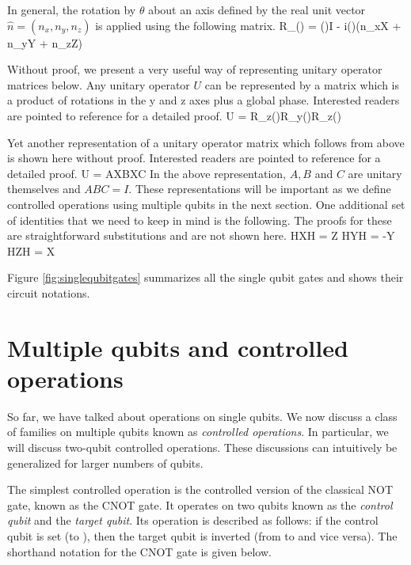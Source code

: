 In general, the rotation by $\theta$ about an axis defined by the real unit vector $\hat{n} = (n_x,n_y,n_z)$ is applied using the following matrix.
\beq
R_{}(\theta) \equiv {} = \cos\left(\right)I - i\sin\left(\right)(n_xX + n_yY + n_zZ)
\eeq

Without proof, we present a very useful way of representing unitary operator matrices below. Any unitary operator $U$ can be represented by a matrix which is a product of rotations in the y and z axes plus a global phase. Interested readers are pointed to reference \cite{nielsen2000} for a detailed proof.
\beq
U = R_z(\beta)R_y(\gamma)R_z(\delta)
\eeq

Yet another representation of a unitary operator matrix which follows from above is shown here without proof. Interested readers are pointed to reference \cite{nielsen2000} for a detailed proof.
\beq
U = AXBXC
\label{eq:unitarytosingle}
\eeq
In the above representation, $A,B$ and $C$ are unitary themselves and $ABC = I$.
These representations will be important as we define controlled operations using multiple qubits in the next section. One additional set of identities that we need to keep in mind is the following. The proofs for these are straightforward substitutions and are not shown here.
\beq
HXH = Z \text{ ; } HYH = -Y \text{ ; } HZH = X
\eeq

Figure \ref{fig:singlequbitgates} summarizes all the single qubit gates and shows their circuit notations.


\section{Multiple qubits and controlled operations}
So far, we have talked about operations on single qubits. We now discuss a class of families on multiple qubits known as \textit{controlled operations}. In particular, we will discuss two-qubit controlled operations. These discussions can intuitively be generalized for larger numbers of qubits.

The simplest controlled operation is the controlled version of the classical \textsc{NOT} gate, known as the \textsc{CNOT} gate. It operates on two qubits known as the \textit{control qubit} and the \textit{target qubit}. Its operation is described as follows: if the control qubit is set (to ), then the target qubit is inverted (from  to  and vice versa). The shorthand notation for the \textsc{CNOT} gate is given below.


